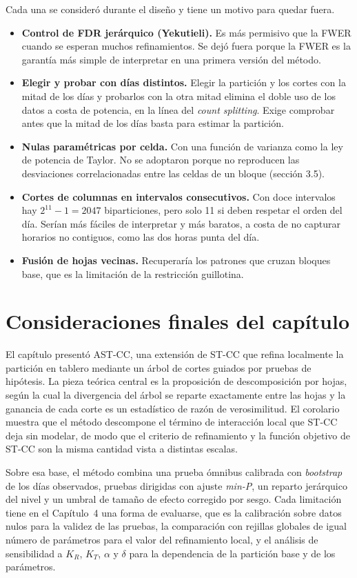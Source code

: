\documentclass[11pt,a4paper]{article}
\begin{document}
Cada una se consideró durante el diseño y tiene un motivo para quedar fuera.

\begin{itemize}
\item \textbf{Control de FDR jerárquico (Yekutieli).} Es más permisivo que la FWER
cuando se esperan muchos refinamientos. Se dejó fuera porque la FWER es la garantía más
simple de interpretar en una primera versión del método.
\item \textbf{Elegir y probar con días distintos.} Elegir la partición y los cortes con
la mitad de los días y probarlos con la otra mitad elimina el doble uso de los datos a
costa de potencia, en la línea del \emph{count splitting}. Exige comprobar antes que la
mitad de los días basta para estimar la partición.
\item \textbf{Nulas paramétricas por celda.} Con una función de varianza como la ley de
potencia de Taylor. No se adoptaron porque no reproducen las desviaciones correlacionadas
entre las celdas de un bloque (sección 3.5).
\item \textbf{Cortes de columnas en intervalos consecutivos.} Con doce intervalos hay
$2^{11}-1=2047$ biparticiones, pero solo 11 si deben respetar el orden del día. Serían
más fáciles de interpretar y más baratos, a costa de no capturar horarios no
contiguos, como las dos horas punta del día.
\item \textbf{Fusión de hojas vecinas.} Recuperaría los patrones que cruzan bloques base,
que es la limitación de la restricción guillotina.
\end{itemize}

\section{Consideraciones finales del capítulo}

El capítulo presentó AST-CC, una extensión de ST-CC que refina localmente la partición
en tablero mediante un árbol de cortes guiados por pruebas de hipótesis. La pieza
teórica central es la proposición de descomposición por hojas, según la cual la
divergencia del árbol se reparte exactamente entre las hojas y la ganancia de cada corte
es un estadístico de razón de verosimilitud. El corolario muestra que el método
descompone el término de interacción local que ST-CC deja sin modelar, de modo que el
criterio de refinamiento y la función objetivo de ST-CC son la misma cantidad vista a
distintas escalas.

Sobre esa base, el método combina una prueba ómnibus calibrada con \emph{bootstrap} de
los días observados, pruebas dirigidas con ajuste \emph{min-P}, un reparto jerárquico
del nivel y un umbral de tamaño de efecto corregido por sesgo. Cada limitación tiene en
el Capítulo~4 una forma de evaluarse, que es la calibración sobre datos nulos para la
validez de las pruebas, la comparación con rejillas globales de igual número de
parámetros para el valor del refinamiento local, y el análisis de sensibilidad a $K_R$,
$K_T$, $\alpha$ y $\delta$ para la dependencia de la partición base y de los parámetros.
\end{document}
